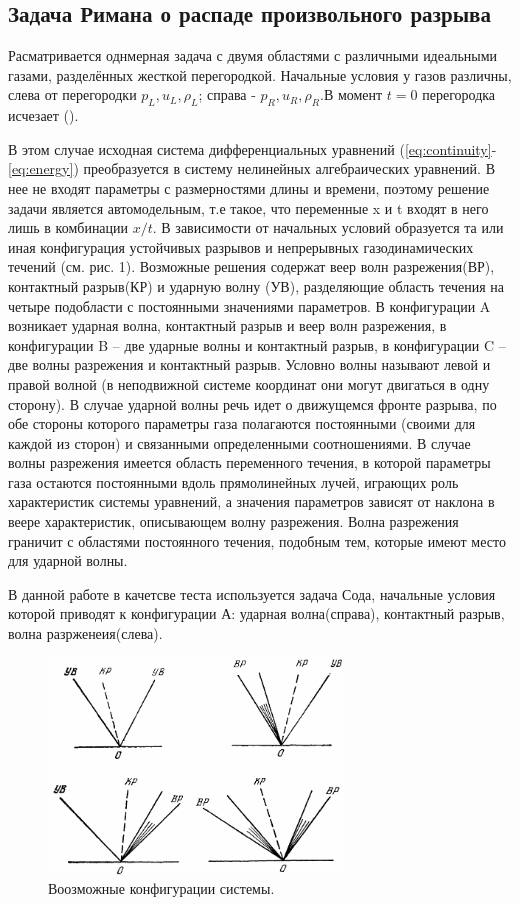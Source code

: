 \documentclass[a4paper,12pt]{extarticle}
\begin{document}
\subsection{Задача Римана о распаде произвольного разрыва}

Расматривается однмерная задача с двумя областями с различными идеальными газами, разделённых жесткой перегородкой. Начальные условия у газов различны, слева от перегородки $p_L, u_L, \rho_L$; справа - $p_R, u_R, \rho_R$.В момент $t=0 $ перегородка исчезает (\cite{BulatVolkov2015,zr1968}).

В этом случае исходная система дифференциальных уравнений (\ref{eq:continuity}-\ref{eq:energy}) преобразуется в систему нелинейных алгебраических уравнений. В нее не входят параметры с размерностями длины и времени, поэтому решение задачи является автомодельным, т.е такое, что переменные x и t входят в него лишь в комбинации \(x/t\).
В зависимости от начальных условий образуется та или иная
конфигурация устойчивых разрывов и непрерывных газодинамических течений (см. рис. 1). Возможные
решения содержат веер волн разрежения(ВР), контактный разрыв(КР) и ударную волну (УВ), разделяющие область
течения на четыре подобласти с постоянными значениями параметров. В конфигурации A возникает
ударная волна, контактный разрыв и веер волн разрежения, в конфигурации B – две ударные волны и
контактный разрыв, в конфигурации C – две волны разрежения и контактный разрыв. Условно волны
называют левой и правой волной (в неподвижной системе координат они могут двигаться в одну сторону). В случае ударной волны речь идет о движущемся фронте разрыва, по обе стороны которого параметры газа полагаются постоянными (своими для каждой из сторон) и связанными определенными соотношениями. В случае волны разрежения имеется область переменного течения, в которой параметры газа
остаются постоянными вдоль прямолинейных лучей, играющих роль характеристик системы уравнений,
а значения параметров зависят от наклона в веере характеристик, описывающем волну разрежения. Волна разрежения граничит с областями постоянного течения, подобным тем, которые имеют место для
ударной волны. 

В данной работе в качетсве теста используется задача Сода, начальные условия которой приводят к конфигурации А: ударная волна(справа), контактный разрыв, волна разрженеия(слева).
\begin{figure}[!htb]
	\centering
	\includegraphics[width=0.7\textwidth]{godunov1976_fig13-1.png}
	\caption{
		Воозможные конфигурации системы.
	}
	\label{fig:configurations}
\end{figure}
\end{document}
